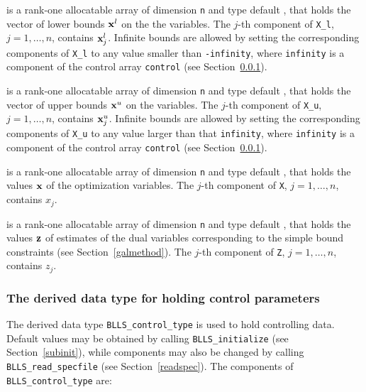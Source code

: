 \documentclass{galahad}
\newcommand{\packagename}{BLLS}
\begin{document}
\begin{description}
 is a rank-one allocatable array of dimension {\tt n} and type
default \realdp, that holds
the vector of lower bounds ${\mathbf{x}}^{l}$ on the the variables.
The $j$-th component of {\tt X\_l}, $j = 1, \ldots , n$,
contains ${\mathbf{x}}_{j}^{l}$.
Infinite bounds are allowed by setting the corresponding
components of {\tt X\_l} to any value smaller than {\tt -infinity},
where {\tt infinity} is a component of the control array {\tt control}
(see Section~\ref{typecontrol}).

 is a rank-one allocatable array of dimension {\tt n} and type
default \realdp, that holds
the vector of upper bounds ${\mathbf{x}}^{u}$ on the variables.
The $j$-th component of {\tt X\_u}, $j = 1, \ldots , n$,
contains ${\mathbf{x}}_{j}^{u}$.
Infinite bounds are allowed by setting the corresponding
components of {\tt X\_u} to any value larger than that {\tt infinity},
where {\tt infinity} is a component of the control array {\tt control}
(see Section~\ref{typecontrol}).

 is a rank-one allocatable array of dimension {\tt n} and type
default \realdp,
that holds the values ${\mathbf{x}}$ of the optimization variables.
The $j$-th component of {\tt X}, $j = 1,  \ldots , n$, contains $x_{j}$.

 is a rank-one allocatable array of dimension {\tt n} and type default
\realdp, that holds
the values ${\mathbf{z}}$ of estimates  of the dual variables
corresponding to the simple bound constraints (see Section~\ref{galmethod}).
The $j$-th component of {\tt Z}, $j = 1,  \ldots ,  n$, contains $z_{j}$.

\end{description}


\subsubsection{The derived data type for holding control
 parameters}\label{typecontrol}
The derived data type
{\tt \packagename\_control\_type}
is used to hold controlling data. Default values may be obtained by calling
{\tt \packagename\_initialize}
(see Section~\ref{subinit}),
while components may also be changed by calling
{\tt \packagename\_read\-\_specfile}
(see Section~\ref{readspec}).
The components of
{\tt \packagename\_control\_type}
are:
\end{document}

